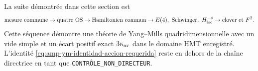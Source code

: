 La suite démontrée dans cette section est
\[
 \text{mesure commune}\to\text{quatre OS}\to\text{Hamiltonien commun}
 \to E(4),\ \text{Schwinger},\ H^{-s}_{\rm loc}
 \to\text{clover et }F^2.
\]
Cette séquence démontre une théorie de Yang--Mills quadridimensionnelle avec un vide
simple et un écart positif exact \(3\kappa_{\rm av}\) dans le domaine HMT
enregistré. L'identité
\eqref{eq:amp-ym-identidad-accion-requerida} reste en dehors de la chaîne
directrice en tant que \texttt{CONTRÔLE\_NON\_DIRECTEUR}.
